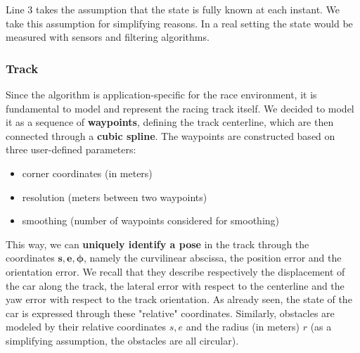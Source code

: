 \documentclass[a4paper, onecolumn, 12pt]{article}
\begin{document}
Line 3 takes the assumption that the state is fully known at each instant. We
take this assumption for simplifying reasons. In a real setting the state would
be measured with sensors and filtering algorithms. 

\newpage
\subsubsection*{Track}
\label{subsec:track}

Since the algorithm is application-specific for the race environment, it is
fundamental to model and represent the racing track itself. We decided to model
it as a sequence of \textbf{waypoints}, defining the track centerline, which are
then connected through a \textbf{cubic spline}. The waypoints are constructed
based on three user-defined parameters:
\begin{itemize}
    \item corner coordinates (in meters)
    \item resolution (meters between two waypoints)
    \item smoothing (number of waypoints considered for smoothing)
\end{itemize}
This way, we can \textbf{uniquely identify a pose} in the track through the
coordinates $\mathbf{s,e,\phi}$, namely the curvilinear abscissa, the position
error and the orientation error. We recall that they describe respectively the
displacement of the car along the track, the lateral error with respect to the
centerline and the yaw error with respect to the track orientation. As already
seen, the state of the car is expressed through these "relative" coordinates.
Similarly, obstacles are modeled by their relative coordinates $s,e$ and the
radius (in meters) $r$ (as a simplifying assumption, the obstacles are all
circular).
\end{document}
